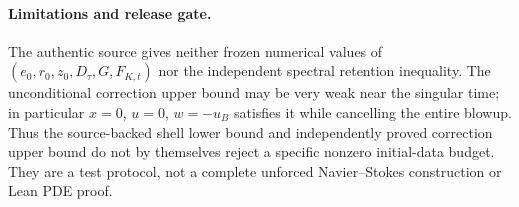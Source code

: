 \paragraph{Limitations and release gate.}
The authentic source gives neither frozen numerical values of
$(e_0,r_0,z_0,D_\tau,G,F_{K,t})$ nor the independent spectral
retention inequality. The unconditional correction upper bound
may be very weak near the singular time; in particular $x=0$,
$u=0$, $w=-u_B$ satisfies it while cancelling the entire blowup.
Thus the source-backed shell lower bound and independently proved
correction upper bound do not by themselves reject a specific
nonzero initial-data budget. They are a test protocol, not a
complete unforced Navier--Stokes construction or Lean PDE proof.
